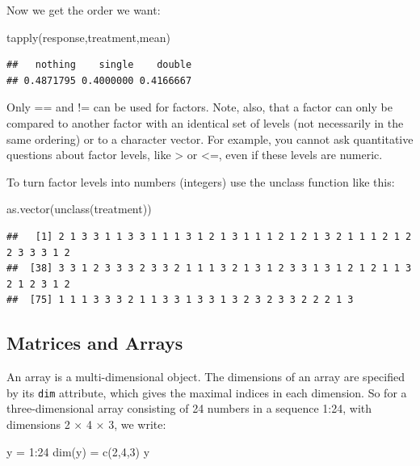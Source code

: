 \documentclass[
]{book}
\newenvironment{Shaded}{\begin{snugshade}}{\end{snugshade}}
\newcommand{\DecValTok}[1]{\textcolor[rgb]{0.00,0.00,0.81}{#1}}
\newcommand{\FunctionTok}[1]{\textcolor[rgb]{0.00,0.00,0.00}{#1}}
\newcommand{\NormalTok}[1]{#1}
\newcommand{\OtherTok}[1]{\textcolor[rgb]{0.56,0.35,0.01}{#1}}
\newcommand{\SpecialCharTok}[1]{\textcolor[rgb]{0.00,0.00,0.00}{#1}}
\theoremstyle{definition}
\theoremstyle{definition}
\theoremstyle{definition}
\theoremstyle{definition}
\theoremstyle{remark}
\begin{document}
Now we get the order we want:

\begin{Shaded}
\begin{Highlighting}[]
\FunctionTok{tapply}\NormalTok{(response,treatment,mean)}
\end{Highlighting}
\end{Shaded}

\begin{verbatim}
##   nothing    single    double 
## 0.4871795 0.4000000 0.4166667
\end{verbatim}

Only == and != can be used for factors. Note, also, that a factor can only be compared to another factor with
an identical set of levels (not necessarily in the same ordering) or to a character vector. For example, you
cannot ask quantitative questions about factor levels, like \textgreater{} or \textless=, even if these levels are numeric.

To turn factor levels into numbers (integers) use the unclass function like this:

\begin{Shaded}
\begin{Highlighting}[]
\FunctionTok{as.vector}\NormalTok{(}\FunctionTok{unclass}\NormalTok{(treatment))}
\end{Highlighting}
\end{Shaded}

\begin{verbatim}
##   [1] 2 1 3 3 1 1 3 3 1 1 1 3 1 2 1 3 1 1 1 2 1 2 1 3 2 1 1 1 2 1 2 2 3 3 3 1 2
##  [38] 3 3 1 2 3 3 3 2 3 3 2 1 1 1 3 2 1 3 1 2 3 3 1 3 1 2 1 2 1 1 3 2 1 2 3 1 2
##  [75] 1 1 1 3 3 3 2 1 1 3 3 1 3 3 1 3 2 3 2 3 3 2 2 2 1 3
\end{verbatim}

\hypertarget{matrices-and-arrays}{%
\subsection{Matrices and Arrays}\label{matrices-and-arrays}}

An array is a multi-dimensional object. The dimensions of an array are specified by its \texttt{dim} attribute, which gives the maximal indices in each dimension. So for a three-dimensional array consisting of 24 numbers in a sequence 1:24, with dimensions 2 × 4 × 3, we write:

\begin{Shaded}
\begin{Highlighting}[]
\NormalTok{y }\OtherTok{=} \DecValTok{1}\SpecialCharTok{:}\DecValTok{24}
\FunctionTok{dim}\NormalTok{(y) }\OtherTok{=} \FunctionTok{c}\NormalTok{(}\DecValTok{2}\NormalTok{,}\DecValTok{4}\NormalTok{,}\DecValTok{3}\NormalTok{)}
\NormalTok{y}
\end{Highlighting}
\end{Shaded}
\end{document}
